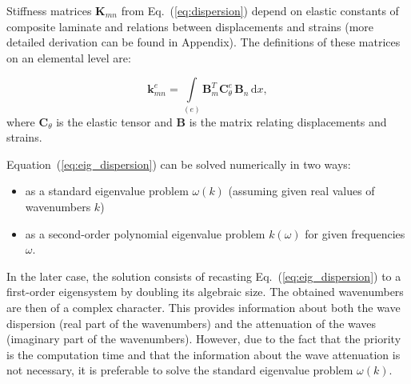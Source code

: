 \documentclass[preprint,12pt]{elsarticle}
\newcommand{\matr}[1]{\mathbf{#1}} %
\newcommand{\ud}{\mathrm{d}}
\begin{document}
	Stiffness matrices $\matr{K}_{mn}$ from Eq.~(\ref{eq:dispersion}) depend on elastic constants of composite laminate and relations between displacements and strains (more detailed derivation can be found in Appendix). The definitions of these matrices on an elemental level are:
	
	\begin{equation}
	\matr{k}_{mn}^e= \int \limits_{(e)} \matr{B}_m^{T} \matr{C}_{\theta}^e \, \matr{B}_n\, \ud x, 
	\label{eq:stiffness_matrix_e}
	\end{equation}
	where $\matr{C}_{\theta}$ is the elastic tensor and $\matr{B}$ is the matrix relating displacements and strains.
	
	Equation~(\ref{eq:eig_dispersion}) can be solved numerically in two ways:
	\begin{itemize}
		\item as a standard eigenvalue problem $\omega (k)$ (assuming given real values of wavenumbers $k$)
		\item as a second-order polynomial eigenvalue problem $k(\omega)$ for given frequencies $\omega$.
	\end{itemize}
In the later case, the solution consists of recasting Eq.~(\ref{eq:eig_dispersion}) to a first-order eigensystem by doubling its algebraic size.  The obtained wavenumbers are then of a complex character. This provides information about both the wave dispersion (real part of the wavenumbers) and the attenuation of the waves (imaginary part of the wavenumbers).  However, due to the fact that the priority is the computation time and that the information about the wave attenuation is not necessary, it is preferable to solve the standard eigenvalue problem $\omega (k)$.
\end{document}
